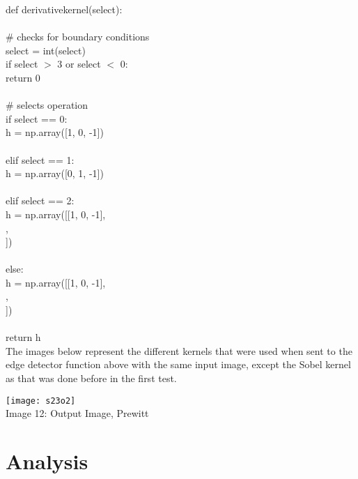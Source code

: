 \documentclass{article}
\begin{document}
	\noindent def derivative\textunderscore kernel(select):\\
	\\
	\indent \# checks for boundary conditions\\
	\indent select = int(select)\\
	\indent if  select $>$ 3 or select $<$ 0:\\
	\indent \indent return 0\\
	\\
	\indent \# selects operation\\
	\indent if select == 0:\\
	\indent \indent h = np.array([1, 0, -1])\\
	\\
	\indent elif select == 1:\\
	\indent \indent h = np.array([0, 1, -1])\\
	\\
	\indent elif select == 2:\\
	\indent \indent h = np.array([[1, 0, -1],\\
	\indent \indent [1, 0, -1],\\
	\indent \indent [1, 0, -1]])\\
	\\
	\indent else:\\
	\indent \indent h = np.array([[1, 0, -1],\\
	\indent \indent [2, 0, -2],\\
	\indent \indent [1, 0, -1]])\\
	\\
	\indent return h\\
	
	The images below represent the different kernels that were used when sent to the edge detector function above with the same input image, except the Sobel kernel as that was done before in the first test.\\
	
		\begin{center}
		\noindent \texttt{[image: s23o2]}\\
		Image 12: Output Image, Prewitt\\
		
	\end{center}
	
	\section{Analysis}
	
\end{document}
